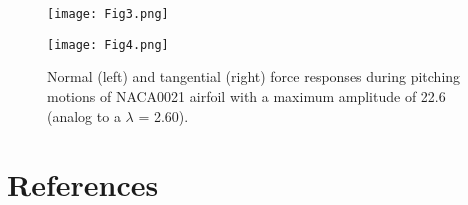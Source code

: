 \documentclass[a4paper]{jpconf}
\begin{document}
\begin{figure}[h]
\begin{minipage}{18pc}
\texttt{[image: Fig3.png]}
\end{minipage}\hspace{2pc}%
\begin{minipage}{18pc}
\texttt{[image: Fig4.png]}
\end{minipage}
\caption{\label{fig2}Normal (left) and tangential (right) force responses during pitching motions of NACA0021 airfoil with a maximum amplitude of 22.6 \degree (analog to a $\lambda$ = 2.60).}
\end{figure}




\section*{References}

{}

\end{document}
